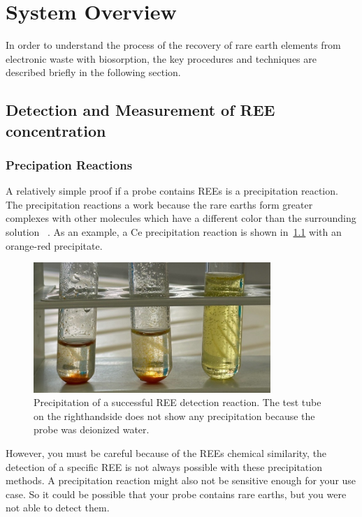\chapter{System Overview}

In order to understand the process of the recovery of rare earth elements from electronic waste with biosorption, the key procedures and techniques are described briefly in the following section.


\section{Detection and Measurement of REE concentration\authorA}

\subsection{Precipation Reactions}
A relatively simple proof if a probe contains REEs is a precipitation reaction.
The precipitation reactions a work because the rare earths form greater complexes with other molecules which have a different color than the surrounding solution ~\cite{janderblasius}.
As an example, a Ce precipitation reaction is shown in~\ref{fig:cer_precipitation_cropped} with an orange-red precipitate.

\begin{figure}[H]
    \centering
    \includegraphics[width=0.8\textwidth]{./media/images/ree_precipitation_reaction_cropped}
    \caption{Precipitation of a successful REE detection reaction. The test tube on the righthandside does not show any precipitation because the probe was deionized water.}
    \label{fig:cer_precipitation_cropped}
\end{figure}

However, you must be careful because of the REEs chemical similarity, the detection of a specific REE is not always possible with these precipitation methods.
A precipitation reaction might also not be sensitive enough for your use case.
So it could be possible that your probe contains rare earths, but you were not able to detect them.

